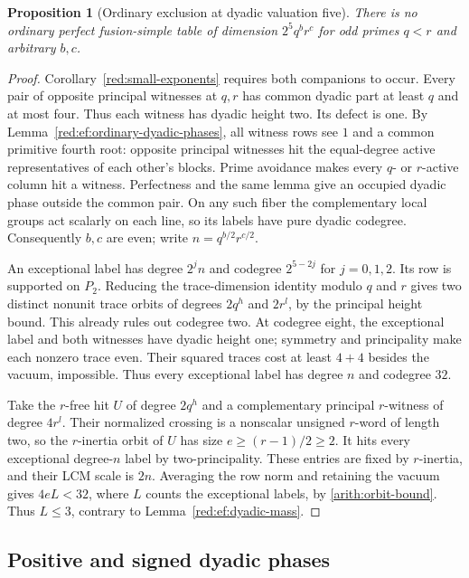 \documentclass[11pt,a4paper]{article}
\numberwithin{equation}{section}
\newtheorem{proposition}[theorem]{Proposition}
\begin{document}
\begin{proposition}[Ordinary exclusion at dyadic valuation five]
\label{red:ef:ordinary-five}
There is no ordinary perfect fusion-simple table of dimension
$2^5q^br^c$ for odd primes $q<r$ and arbitrary $b,c$.
\end{proposition}
\begin{proof}
Corollary~\ref{red:small-exponents} requires both companions to occur.
Every pair of opposite principal witnesses at $q,r$ has common
dyadic part at least $q$ and at most four. Thus each witness has
dyadic height two. Its defect is one. By
Lemma~\ref{red:ef:ordinary-dyadic-phases}, all witness rows see
$1$ and a common primitive fourth root: opposite principal
witnesses hit the equal-degree active representatives of each
other's blocks. Prime avoidance makes every $q$- or $r$-active
column hit a witness. Perfectness and the same lemma give an
occupied dyadic phase outside the common pair. On any such
fiber the complementary local groups act scalarly on each line,
so its labels have pure dyadic codegree. Consequently $b,c$ are
even; write $n=q^{b/2}r^{c/2}$.

An exceptional label has degree $2^j n$ and codegree
$2^{5-2j}$ for $j=0,1,2$. Its row is supported on $P_2$.
Reducing the trace-dimension identity modulo $q$ and $r$ gives
two distinct nonunit trace orbits of degrees $2q^h$ and $2r^l$,
by the principal height bound. This already rules out codegree
two. At codegree eight, the exceptional label and both witnesses
have dyadic height one; symmetry and principality make each
nonzero trace even. Their squared traces cost at least $4+4$
besides the vacuum, impossible. Thus every exceptional label
has degree $n$ and codegree $32$.

Take the $r$-free hit $U$ of degree $2q^h$ and a complementary
principal $r$-witness of degree $4r^l$. Their normalized crossing
is a nonscalar unsigned $r$-word of length two, so the
$r$-inertia orbit of $U$ has size $e\ge(r-1)/2\ge2$.
It hits every exceptional degree-$n$ label by two-principality.
These entries are fixed by $r$-inertia, and their LCM scale is
$2n$. Averaging the row norm and retaining the vacuum gives
$4eL<32$, where $L$ counts the exceptional labels, by
\eqref{arith:orbit-bound}. Thus $L\le3$, contrary to Lemma~\ref{red:ef:dyadic-mass}.
\end{proof}

\subsection{Positive and signed dyadic phases}
\end{document}
